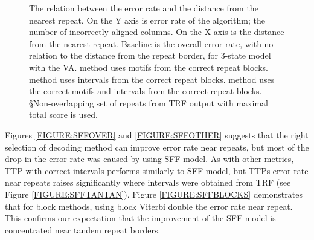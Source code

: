 \begin{figure}
\begin{center}
\caption[Relation between the error rate and distance from the repeat]{
The relation between the error rate and the distance from the nearest repeat. On the Y
axis is error rate of the algorithm; the number of incorrectly aligned columns.
On the X axis is the distance from the nearest repeat. Baseline is the overall
error rate, with no relation to the distance from the repeat border, for
3-state model with the VA.
\M method uses motifs from the correct repeat blocks.
\D method uses intervals from the correct repeat blocks.
\MM method uses the correct motifs and intervals from the
    correct repeat blocks.
\S Non-overlapping set of repeats from TRF output with maximal total
    score is used.}\label{FIGURE:SFF_GRAPHS} 
\end{center}
\end{figure}

Figures \ref{FIGURE:SFFOVER} and \ref{FIGURE:SFFOTHER} suggests that the right
selection of decoding method can improve error rate near repeats, but most of
the drop in the error rate was caused by using SFF model. As with other
metrics, TTP with correct intervals performs similarly to SFF model, but TTPs
error rate near repeats raises significantly where intervals were obtained from
TRF (see Figure \ref{FIGURE:SFFTANTAN}).  Figure \ref{FIGURE:SFFBLOCKS}
demonstrates that for block methods, using block Viterbi double the error rate
near repeat.  This confirms our expectation that the improvement of the SFF
model is concentrated near tandem repeat borders.


